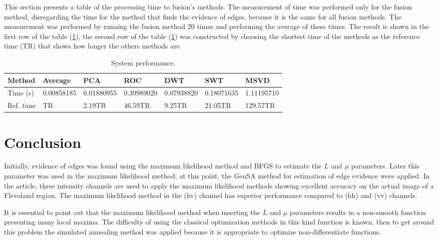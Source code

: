 \documentclass[journal]{IEEEtran}
\begin{document}
This section presents a table of the processing time to fusion's methods. The measurement of time was performed only for the fusion method, disregarding the time for the method that finds the evidence of edges, because it is the same for all fusion methods. The measurement was performed by running the fusion method 20 times and performing the average of these times. The result is shown in the first row of the table (\ref{metrica_de_tempo}), the second row of the table  (\ref{metrica_de_tempo}) was constructed by choosing the shortest time of the methods as the reference time (TR) that shows how longer the others methods are.
\begin{table}[hbt]
	\centering
	\tiny
	\caption{System performance.}\label{metrica_de_tempo}
\begin{tabular}{@{}lllllll@{}} \toprule
	Method       & Average    &   PCA      &  ROC      & DWT       &  SWT        &  MSVD \\ \midrule
	Time (s)      & 0.00858185 & 0.01880955 &0.39989020 &0.07938820 &  0.18071635 & 1.11195710  \\
    Ref. time     & TR & 2.19TR &46.59TR & 9.25TR   & 21.05TR & 129.57TR  \\ \bottomrule
\end{tabular}
\end{table}
\section{Conclusion}\label{sec_06}

Initially, evidence of edges was found using the maximum likelihood method and BFGS to estimate the $L$ and $\mu$ parameters. Later this parameter was used in the maximum likelihood method; at this point, the GenSA method for estimation of edge evidence were applied. In the article, three intensity channels are used to apply the maximum likelihood methods showing excellent accuracy on the actual image of a Flevoland region. The maximum likelihood method in the (hv) channel has superior performance compared to (hh) and (vv) channels.

It is essential to point out that the maximum likelihood method when inserting the $L$ and $\mu$ parameters results in a non-smooth function presenting many local maxima. The difficulty of using the classical optimization methods in this kind function is known, then to get around this problem the simulated annealing method was applied because it is appropriate to optimize non-differentiate functions.
\end{document}
